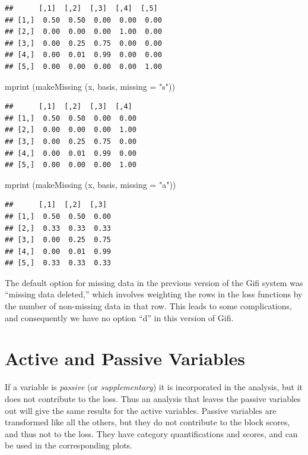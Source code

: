\documentclass[
  12pt,
]{book}
\newenvironment{Shaded}{\begin{snugshade}}{\end{snugshade}}
\newcommand{\AttributeTok}[1]{\textcolor[rgb]{0.77,0.63,0.00}{#1}}
\newcommand{\FunctionTok}[1]{\textcolor[rgb]{0.00,0.00,0.00}{#1}}
\newcommand{\NormalTok}[1]{#1}
\newcommand{\StringTok}[1]{\textcolor[rgb]{0.31,0.60,0.02}{#1}}
\begin{document}
\begin{verbatim}
##      [,1]  [,2]  [,3]  [,4]  [,5] 
## [1,]  0.50  0.50  0.00  0.00  0.00
## [2,]  0.00  0.00  0.00  1.00  0.00
## [3,]  0.00  0.25  0.75  0.00  0.00
## [4,]  0.00  0.01  0.99  0.00  0.00
## [5,]  0.00  0.00  0.00  0.00  1.00
\end{verbatim}

\begin{Shaded}
\begin{Highlighting}[]
\FunctionTok{mprint}\NormalTok{ (}\FunctionTok{makeMissing}\NormalTok{ (x, basis, }\AttributeTok{missing =} \StringTok{"s"}\NormalTok{))}
\end{Highlighting}
\end{Shaded}

\begin{verbatim}
##      [,1]  [,2]  [,3]  [,4] 
## [1,]  0.50  0.50  0.00  0.00
## [2,]  0.00  0.00  0.00  1.00
## [3,]  0.00  0.25  0.75  0.00
## [4,]  0.00  0.01  0.99  0.00
## [5,]  0.00  0.00  0.00  1.00
\end{verbatim}

\begin{Shaded}
\begin{Highlighting}[]
\FunctionTok{mprint}\NormalTok{ (}\FunctionTok{makeMissing}\NormalTok{ (x, basis, }\AttributeTok{missing =} \StringTok{"a"}\NormalTok{))}
\end{Highlighting}
\end{Shaded}

\begin{verbatim}
##      [,1]  [,2]  [,3] 
## [1,]  0.50  0.50  0.00
## [2,]  0.33  0.33  0.33
## [3,]  0.00  0.25  0.75
## [4,]  0.00  0.01  0.99
## [5,]  0.33  0.33  0.33
\end{verbatim}

The default option for missing data in the previous version of the Gifi system was ``missing data deleted,'' which involves weighting the rows in the loss functions by the number of non-missing data in that row. This leads to some complications,
and consequently we have no option ``d'' in this version of Gifi.

\hypertarget{active-and-passive-variables}{%
\section{Active and Passive Variables}\label{active-and-passive-variables}}

If a variable is \emph{passive} (or \emph{supplementary}) it is incorporated in the analysis, but it does not contribute to the loss. Thus an analysis that leaves the passive variables out will give the same results for the active variables.
Passive variables are transformed like all the others, but they do not contribute to the block scores, and thus not
to the loss. They have category quantifications and scores, and can be used in the corresponding plots.
\end{document}
